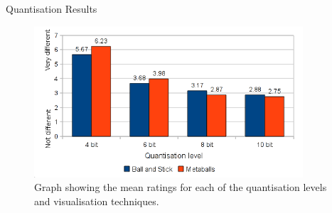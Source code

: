 \documentclass{beamer}
\begin{document}
\begin{frame}{Quantisation Results}
\begin{figure}
  \centering
  \includegraphics[width=100mm]{min-images/bm-means.png}
  \caption{Graph showing the mean ratings for each of the quantisation levels and visualisation techniques.}
\end{figure}
\end{frame}


\end{document}
